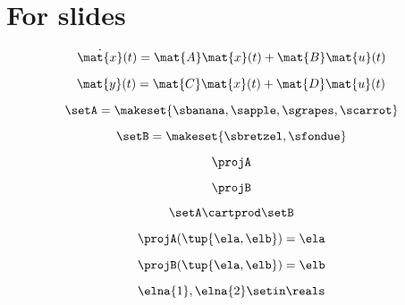 
\section[For slides]{For slides}

\begin{forslides}

    \begin{equation}
        \label{eq:feedback-000}
        \dot{\mat{x}}(t) = \mat{A} \mat{x}(t) + \mat{B} \mat{u}(t)
    \end{equation}

    \begin{equation}
        \label{eq:feedback-001}
        \mat{y}(t)      = \mat{C}\mat{x}(t) + \mat{D}\mat{u}(t) 
    \end{equation}

    \begin{equation}
        \label{eq:feedback-002}
        \setA = \makeset{\sbanana, \sapple, \sgrapes, \scarrot}
    \end{equation}

    \begin{equation}
        \label{eq:feedback-003}
        \setB = \makeset{ \sbretzel, \sfondue }
    \end{equation}

    \begin{equation}
        \label{eq:feedback-004}
        \projA
    \end{equation}

    \begin{equation}
        \label{eq:feedback-005}
        \projB
    \end{equation}

    \begin{equation}
        \label{eq:feedback-006}
        \setA \cartprod \setB
    \end{equation}

    \begin{equation}
        \label{eq:feedback-007}
        \projA(\tup{\ela,\elb}) =  \ela
    \end{equation}

    \begin{equation}
        \label{eq:feedback-008}
        \projB(\tup{\ela,\elb}) = \elb
    \end{equation}

    \begin{equation}
        \label{eq:feedback-009}
        \elna{1},\elna{2}\setin \reals
    \end{equation}


\end{forslides}
